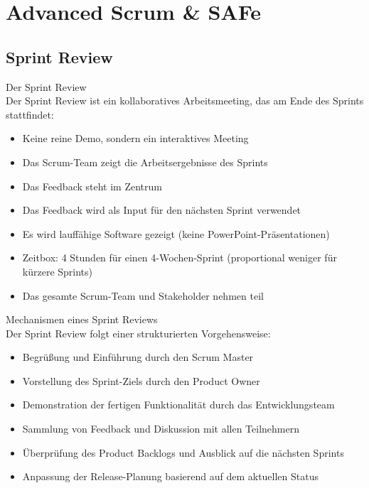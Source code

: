 \section{Advanced Scrum \& SAFe}

\subsection{Sprint Review}

\begin{definition}{Der Sprint Review}\\
    Der Sprint Review ist ein kollaboratives Arbeitsmeeting, das am Ende des Sprints stattfindet:
    \begin{itemize}
        \item Keine reine Demo, sondern ein interaktives Meeting
        \item Das Scrum-Team zeigt die Arbeitsergebnisse des Sprints
        \item Das Feedback steht im Zentrum
        \item Das Feedback wird als Input für den nächsten Sprint verwendet
        \item Es wird lauffähige Software gezeigt (keine PowerPoint-Präsentationen)
        \item Zeitbox: 4 Stunden für einen 4-Wochen-Sprint (proportional weniger für kürzere Sprints)
        \item Das gesamte Scrum-Team und Stakeholder nehmen teil
    \end{itemize}
\end{definition}

\begin{concept}{Mechanismen eines Sprint Reviews}\\
    Der Sprint Review folgt einer strukturierten Vorgehensweise:
    \begin{itemize}
        \item Begrüßung und Einführung durch den Scrum Master
        \item Vorstellung des Sprint-Ziels durch den Product Owner
        \item Demonstration der fertigen Funktionalität durch das Entwicklungsteam
        \item Sammlung von Feedback und Diskussion mit allen Teilnehmern
        \item Überprüfung des Product Backlogs und Ausblick auf die nächsten Sprints
        \item Anpassung der Release-Planung basierend auf dem aktuellen Status
    \end{itemize}
\end{concept}


